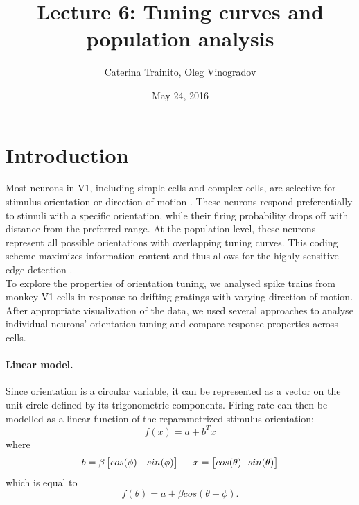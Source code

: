 \documentclass[10pt]{article}
\title{Lecture 6: Tuning curves and population analysis}
\author{Caterina Trainito, Oleg Vinogradov}
\date{May 24, 2016}
\begin{document}
\maketitle

\section*{Introduction}

Most neurons in V1, including simple cells and complex cells, are selective for stimulus orientation or direction of motion \cite{hubel1962receptive}. These neurons respond preferentially to stimuli with a specific orientation, while their firing probability drops off with distance from the preferred range. At the population level, these neurons represent all possible orientations with overlapping tuning curves. This coding scheme maximizes information content \cite{snippe1996parameter} and thus allows for the highly sensitive edge detection \cite{marr1980theory}. \\

To explore the properties of orientation tuning, we analysed spike trains from monkey V1 cells in response to drifting gratings with varying direction of motion. After appropriate visualization of the data, we used several approaches to analyse individual neurons' orientation tuning and compare response properties across cells.
\paragraph{Linear model.} Since orientation is a circular variable, it can be represented as a vector on the unit circle defined by its trigonometric components. Firing rate can then be modelled as a linear function of the reparametrized stimulus orientation:
\begin{equation*}
f(x) = a+b^Tx
\end{equation*}
where 
\begin{align*}
b = \beta \begin{bmatrix}
cos (\phi) & sin (\phi )
 \end{bmatrix}  
 \hspace{5mm}
 x =  \begin{bmatrix}
cos (\theta) \ \
  sin (\theta)
 \end{bmatrix} 
\end{align*}
which is equal to 
\begin{equation*}
f(\theta) = a+ \beta cos(\theta - \phi).
\end{equation*}
\end{document}
